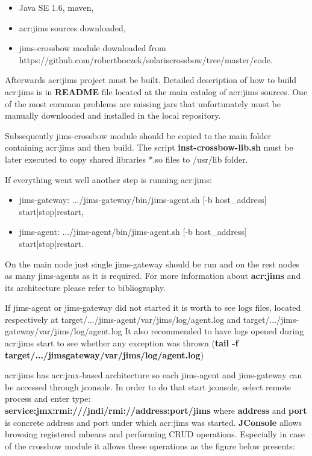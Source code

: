 \documentclass[11pt]{book}
\begin{document}
      \begin{itemize}
        \item Java SE 1.6, maven,
        \item \gls{acr:jims} sources downloaded,
        \item jims-crossbow module downloaded from \\ https://github.com/robertboczek/solaris\-crossbow/tree/master/code.
      \end{itemize}

      Afterwards \gls{acr:jims} project must be built. Detailed description of how to build \gls{acr:jims} is in \textbf{README} file
      located at the main catalog of \gls{acr:jims} sources. One of the most common problems are missing jars that unfortunately
      must be manually downloaded and installed in the local repository.

      Subsequently jims-crossbow module should be copied to the main folder containing \gls{acr:jims} and then build. The script
      \textbf{inst-crossbow-lib.sh} must be	later executed to copy shared libraries *.so files to /usr/lib folder.

      If everything went well another step is running \gls{acr:jims}:

      \begin{itemize}
        \item jims-gateway: .../jims-gateway/bin/jims-agent.sh [-b host\_address] start|stop|restart,
        \item jims-agent: .../jims-agent/bin/jims-agent.sh [-b host\_address] start|stop|restart.
      \end{itemize}

      On the main node just single jims-gateway should be run and on the rest nodes as many jims-agents as it is required. For more
      information about \textbf{\gls{acr:jims}} and its architecture please refer to bibliography.

      If jims-agent or jims-gateway did not started it is worth to see logs files, located respectively at
      target/.../jims-agent/var/jims/log/agent.log and target/.../jims-gateway/var/jims/log/agent.log
      It also recommended to have logs opened during \gls{acr:jims} start to see whether any exception was thrown (\textbf{tail
      -f target/.../jims\-gateway/var/jims/log/agent.log})

      \gls{acr:jims} has \gls{acr:jmx}-based architecture so each jims-agent and jims-gateway can be accessed through jconsole. In order to do that start 
      jconsole, select remote process and enter type: \\ \textbf{service:jmx:rmi:///jndi/rmi://address:port/jims} where \textbf{address} and 
      \textbf{port} is concrete address and port under which \gls{acr:jims} was started. \textbf{JConsole} allows browsing registered mbeans and 
      performing CRUD operations. Especially in case of the crossbow module it allows these operations as
      the figure below presents:
\end{document}
